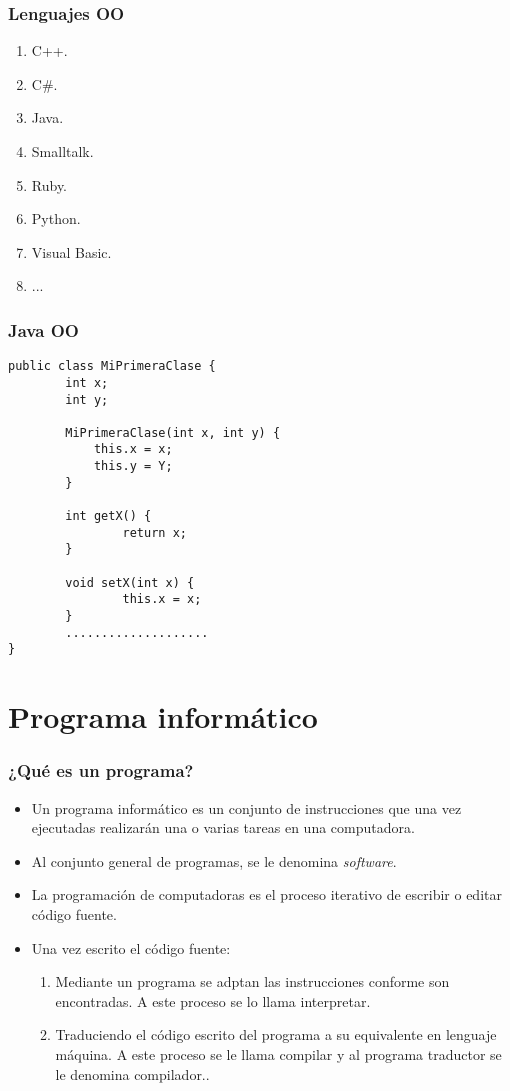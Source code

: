 \documentclass{beamer}
\begin{document}
\begin{frame}
\frametitle{Lenguajes OO}
\begin{enumerate}
\item C++.
\item C\#.
\item Java.
\item Smalltalk.
\item Ruby.
\item Python.
\item Visual Basic.
\item ...
\end{enumerate}
\end{frame}

\begin{frame}[fragile]
\frametitle{Java OO}
\begin{verbatim}
public class MiPrimeraClase {
        int x;
        int y;

        MiPrimeraClase(int x, int y) {
            this.x = x;
            this.y = Y;
        }

        int getX() {
                return x;
        }

        void setX(int x) {
                this.x = x;
        }
        ....................
}
\end{verbatim}
\end{frame}

\section{Programa informático} 

\begin{frame}
\frametitle{¿Qué es un programa?}
\begin{itemize}[<+->]
\item Un programa informático es un conjunto de instrucciones que una vez ejecutadas realizarán una o varias tareas en una computadora.
\item Al conjunto general de programas, se le denomina \emph{software}.
\item La programación de computadoras es el proceso iterativo de escribir o editar código fuente. 
\item Una vez escrito el código fuente:
\begin{enumerate}
\item Mediante un programa se adptan las instrucciones conforme son encontradas. A este proceso se lo llama interpretar.
\item Traduciendo el código escrito del programa a su equivalente en lenguaje máquina. A este proceso se le llama compilar y al programa traductor se le denomina compilador..
\end{enumerate}
\end{itemize}
\end{frame}
\end{document}
